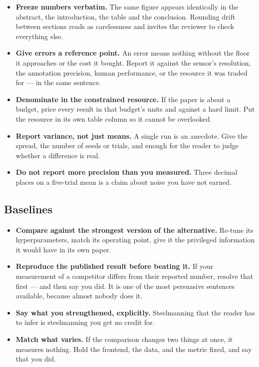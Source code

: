 \documentclass[11pt,a4paper]{article}
\begin{document}
\begin{itemize}
  \item \textbf{Freeze numbers verbatim.} The same figure appears identically
    in the abstract, the introduction, the table and the conclusion. Rounding
    drift between sections reads as carelessness and invites the reviewer to
    check everything else.
  \item \textbf{Give errors a reference point.} An error means nothing
    without the floor it approaches or the cost it bought. Report it against
    the sensor's resolution, the annotation precision, human performance, or
    the resource it was traded for --- in the same sentence.
  \item \textbf{Denominate in the constrained resource.} If the paper is
    about a budget, price every result in that budget's units and against a
    hard limit. Put the resource in its own table column so it cannot be
    overlooked.
  \item \textbf{Report variance, not just means.} A single run is an
    anecdote. Give the spread, the number of seeds or trials, and enough for
    the reader to judge whether a difference is real.
  \item \textbf{Do not report more precision than you measured.} Three
    decimal places on a five-trial mean is a claim about noise you have not
    earned.
\end{itemize}

\subsection*{Baselines}

\begin{itemize}
  \item \textbf{Compare against the strongest version of the alternative.}
    Re-tune its hyperparameters, match its operating point, give it the
    privileged information it would have in its own paper.
  \item \textbf{Reproduce the published result before beating it.} If your
    measurement of a competitor differs from their reported number, resolve
    that first --- and then say you did. It is one of the most persuasive
    sentences available, because almost nobody does it.
  \item \textbf{Say what you strengthened, explicitly.} Steelmanning that the
    reader has to infer is steelmanning you get no credit for.
  \item \textbf{Match what varies.} If the comparison changes two things at
    once, it measures nothing. Hold the frontend, the data, and the metric
    fixed, and say that you did.
\end{itemize}
\end{document}
